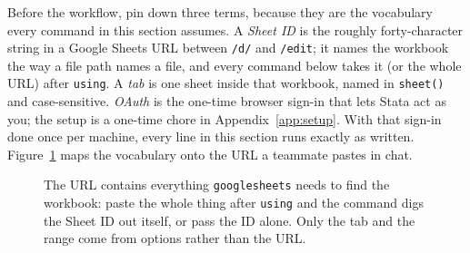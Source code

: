 \documentclass[
    a4paper,
    fontsize=10pt,
    twoside=true,
    numbers=noenddot,
]{kaobook}
\begin{document}
Before the workflow, pin down three terms, because they are the vocabulary every command in this section assumes. A \emph{Sheet ID} is the roughly forty-character string in a Google Sheets URL between \texttt{/d/} and \texttt{/edit}; it names the workbook the way a file path names a file, and every command below takes it (or the whole URL) after \texttt{using}. A \emph{tab} is one sheet inside that workbook, named in \texttt{sheet()} and case-sensitive. \emph{OAuth} is the one-time browser sign-in that lets Stata act as you; the setup is a one-time chore in Appendix~\ref{app:setup}. With that sign-in done once per machine, every line in this section runs exactly as written. Figure~\ref{fig:ch11-viz-sheeturl} maps the vocabulary onto the URL a teammate pastes in chat.

\begin{figure}[htbp]
\centering
{}
\caption[Anatomy of a Google Sheets URL]{The URL contains everything \texttt{googlesheets} needs to find the workbook: paste the whole thing after \texttt{using} and the command digs the Sheet ID out itself, or pass the ID alone. Only the tab and the range come from options rather than the URL.}
\label{fig:ch11-viz-sheeturl}
\end{figure}
\end{document}
